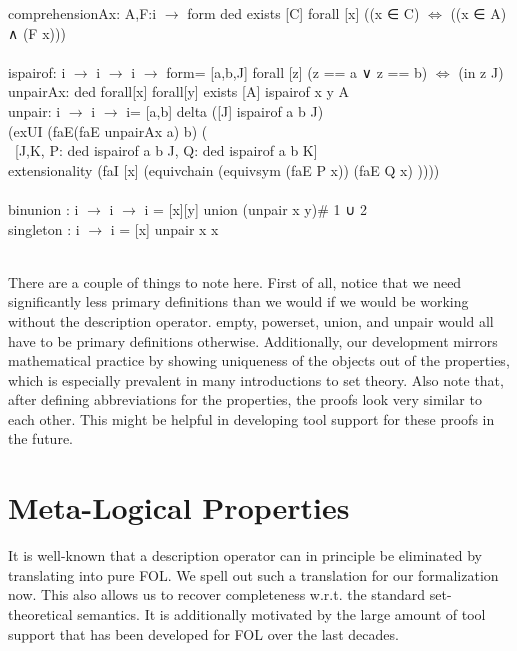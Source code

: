 \documentclass{article}
\begin{document}
\begin{listing}
  comprehensionAx: {A,F:i $\rightarrow$ form} ded exists [C] forall [x] ((x ‍∈ C) $\Leftrightarrow$ ((x ‍∈ A) ∧ (F x)))\\
  \\
  ispairof: i $\rightarrow$ i $\rightarrow$ i $\rightarrow$ form= [a,b,J] forall [z] (z == a ∨ z == b) $\Leftrightarrow$ (in z J)\\
  unpairAx: ded forall[x] forall[y] exists [A] ispairof x y A   \\
  unpair: i $\rightarrow$ i $\rightarrow$ i= [a,b] delta ([J] ispairof a b J) \\
  				(exUI (faE(faE unpairAx a) b) (\\
  		\ 		[J,K, P: ded ispairof a b J, Q: ded ispairof a b K]\\
  				extensionality (faI [x] (equivchain (equivsym (faE P x)) (faE Q x) ))))\\
   				\\
  binunion : i $\rightarrow$ i $\rightarrow$ i = [x][y] union (unpair x y)\# 1 ∪ 2\\
  singleton : i $\rightarrow$ i = [x] unpair x x\\
\\
\end{listing}
There are a couple of things to note here. First of all, notice that we need significantly less primary definitions than we  would if we would be working without the description operator. empty, powerset, union, and unpair would all have to be primary definitions otherwise. Additionally, our development mirrors mathematical practice by showing uniqueness of the objects out of the properties, which is especially prevalent in many introductions to set theory. Also note that, after defining abbreviations for the properties, the proofs look very similar to each other. This might be helpful in developing tool support for these proofs in the future.

\section{Meta-Logical Properties}

It is well-known that a description operator can in principle be eliminated by translating into pure FOL. We spell out such a translation for our formalization now. This also allows us to recover completeness w.r.t. the standard set-theoretical semantics. It is additionally motivated by the large amount of tool support that has been developed for FOL over the last decades. 
\end{document}
